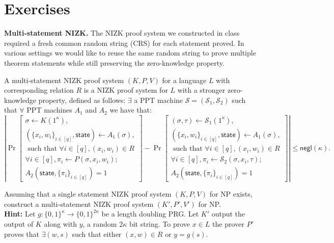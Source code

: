 \section*{Exercises}
\begin{exercise}
\textbf{Multi-statement NIZK.} The NIZK proof system we constructed in class required a fresh common random string (CRS) for each statement proved. In various settings we would like to reuse the same random string to prove multiple theorem statements while still preserving the zero-knowledge property.
    
    A multi-statement NIZK proof system $(K,P,V)$ for a language $L$ with corresponding relation $R$ is a NIZK proof system for $L$ with a stronger zero-knowledge property, defined as follows: $\exists$ a PPT machine $\mathcal{S} = (\mathcal{S}_1,\mathcal{S}_2)$ such that $\forall$ PPT machines $A_1$ and $A_2$ we have that:
    \[\left|\Pr\left[\begin{split}\sigma \gets K(1^\kappa),\\ (\{x_i,w_i\}_{i \in [q]},\textsf{state}) \gets A_1(\sigma),\\ \text{ such that } \forall i \in [q], (x_i,w_i)\in R\\\forall i \in [q],  \pi_i \gets P(\sigma, x_i,w_i);\\
    A_2(\textsf{state}, \{\pi_i\}_{i \in [q]}) =1\end{split}\right]
    -
    \Pr\left[\begin{split}(\sigma,\tau) \gets \mathcal{S}_1(1^\kappa),\\ (\{x_i,w_i\}_{i \in [q]},\textsf{state}) \gets A_1(\sigma),\\\text{ such that } \forall i \in [q], (x_i,w_i)\in R\\\forall i \in [q],  \pi_i \gets \mathcal{S}_2(\sigma, x_i,\tau);\\ A_2(\textsf{state}, \{\pi_i\}_{i \in [q]})=1\end{split}\right]\right|
    \leq \textsf{negl}(\kappa).
    \]
    
    Assuming that a single statement NIZK proof system $(K,P,V)$ for NP exists, construct a multi-statement NIZK proof system $(K',P',V')$ for NP.\\
\textbf{Hint:} Let $g: \{0,1\}^\kappa \rightarrow \{0,1\}^{2\kappa}$ be a length doubling PRG. Let $K'$ output the output of $K$ along with $y$, a random $2\kappa$ bit string. To prove $x \in L$ the prover $P'$ proves that $\exists (w,s)$ such that either $(x,w)\in R$ or $y = g(s)$.
\end{exercise}
